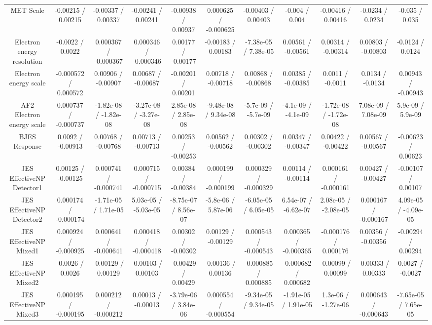 \begin{table}[htbp]
\begin{center}
\begin{tabular}{|c|c|c|c|c|c|c|c|c|c|c|}
  MET Scale & -0.00215 / 0.00215 & -0.00337 / 0.00337 & -0.00241 / 0.00241 & -0.00938 / 0.00937 & 0.000625 / -0.000625 & -0.00403 / 0.00403 & -0.004 / 0.004 & -0.00416 / 0.00416 & -0.0234 / 0.0234 & -0.035 / 0.035 \\ 
  Electron energy resolution & -0.0022 / 0.0022 & 0.000367 / -0.000367 & 0.000346 / -0.000346 & 0.00177 / -0.00177 & -0.00183 / 0.00183 & -7.38e-05 / 7.38e-05 & 0.00561 / -0.00561 & 0.00314 / -0.00314 & 0.00803 / -0.00803 & -0.0124 / 0.0124 \\ 
  Electron energy scale & -0.000572 / 0.000572 & 0.00906 / -0.00907 & 0.00687 / -0.00687 & -0.00201 / 0.00201 & 0.00718 / -0.00718 & 0.00868 / -0.00868 & 0.00385 / -0.00385 & 0.0011 / -0.0011 & 0.0134 / -0.0134 & 0.00943 / -0.00943 \\ 
  AF2 Electron energy scale & 0.000737 / -0.000737 & -1.82e-08 / -1.82e-08 & -3.27e-08 / -3.27e-08 & 2.85e-08 / 2.85e-08 & -9.48e-08 / 9.34e-08 & -5.7e-09 / -5.7e-09 & -4.1e-09 / -4.1e-09 & -1.72e-08 / -1.72e-08 & 7.08e-09 / 7.08e-09 & 5.9e-09 / 5.9e-09 \\ 
  BJES Response & 0.0092 / -0.00913 & 0.00768 / -0.00768 & 0.00713 / -0.00713 & 0.00253 / -0.00253 & 0.00562 / -0.00562 & 0.00302 / -0.00302 & 0.00347 / -0.00347 & 0.00422 / -0.00422 & 0.00567 / -0.00567 & -0.00623 / 0.00623 \\ 
  JES EffectiveNP Detector1 & 0.00125 / -0.00125 & 0.000741 / -0.000741 & 0.000715 / -0.000715 & 0.00384 / -0.00384 & 0.000199 / -0.000199 & 0.000329 / -0.000329 & 0.00114 / -0.00114 & 0.000161 / -0.000161 & 0.00427 / -0.00427 & -0.00107 / 0.00107 \\ 
  JES EffectiveNP Detector2 & 0.000174 / -0.000174 & -1.71e-05 / 1.71e-05 & 5.03e-05 / -5.03e-05 & -8.75e-07 / 8.56e-07 & -5.8e-06 / 5.87e-06 & -6.05e-05 / 6.05e-05 & 6.54e-07 / -6.62e-07 & 2.08e-05 / -2.08e-05 & 0.000167 / -0.000167 & 4.09e-05 / -4.09e-05 \\ 
  JES EffectiveNP Mixed1 & 0.000924 / -0.000925 & 0.000641 / -0.000641 & 0.000418 / -0.000418 & 0.00302 / -0.00302 & 0.00129 / -0.00129 & 0.000543 / -0.000543 & 0.000365 / -0.000365 & -0.000176 / 0.000176 & 0.00356 / -0.00356 & -0.00294 / 0.00294 \\ 
  JES EffectiveNP Mixed2 & -0.0026 / 0.0026 & -0.00129 / 0.00129 & -0.00103 / 0.00103 & -0.00429 / 0.00429 & -0.00136 / 0.00136 & -0.000885 / 0.000885 & -0.000682 / 0.000682 & -0.00099 / 0.00099 & -0.00333 / 0.00333 & 0.0027 / -0.0027 \\ 
  JES EffectiveNP Mixed3 & 0.000195 / -0.000195 & 0.000212 / -0.000212 & 0.00013 / -0.00013 & -3.79e-06 / 3.84e-06 & 0.000554 / -0.000554 & -9.34e-05 / 9.34e-05 & -1.91e-05 / 1.91e-05 & 1.3e-06 / -1.27e-06 & 0.000643 / -0.000643 & -7.65e-05 / 7.65e-05 \\ 

\end{tabular}
\end{center}
\end{table}
